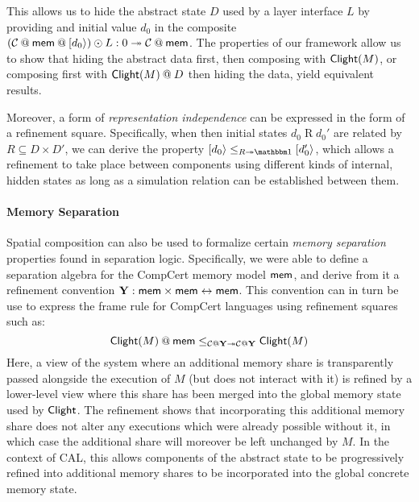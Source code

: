 \begin{example}
This allows us to hide the abstract state $D$
used by a layer interface $L$ by providing and initial value $d_0$
in the composite
$
  (\mathcal{C} \mathbin@ \kw{mem} \mathbin@ [d_0\rangle) \odot L :
  \emptysig \twoheadrightarrow \mathcal{C} \mathbin@ \kw{mem}
$.
The properties of our framework allow us to show that
hiding the abstract data first, then composing with $ \mathsf{Clight} (M)$,
or composing first with $\kw{Clight}(M)\mathbin@ D$ then hiding the data,
yield equivalent results.
\end{example}

Moreover, a form of \emph{representation independence}
can be expressed in the form of a refinement square.
Specifically,
when then initial states $d_0 \mathrel{R} d_0'$
are related by $R \subseteq D \times D'$,
we can derive the property
$
  [d_0 \rangle \le_{R \twoheadrightarrow \mathbbm1} [d_0'\rangle
$,
which allows a refinement to take place between components
using different kinds of internal, hidden states
as long as a simulation relation can be established between them.

\paragraph{Memory Separation}

Spatial composition can also be used to formalize
certain \emph{memory separation} properties found in separation logic.
Specifically,
we were able to define a separation algebra for the CompCert memory model $ \mathsf{mem} $,
and derive from it a refinement convention
$\mathbf{Y} :  \mathsf{mem}  \times  \mathsf{mem}  \leftrightarrow  \mathsf{mem} $.
This convention can in turn be use to express the frame rule
for CompCert languages using refinement squares such as:
\[
  \kw{Clight}(M) \mathbin@ \kw{mem} \le_{\mathcal{C} \mathbin@ \mathbf{Y} \twoheadrightarrow
  \mathcal{C} \mathbin@ \mathbf{Y}} \kw{Clight}(M)
\]
Here, a view of the system where an additional memory share
is transparently passed alongside the execution of $M$ (but does not interact with it)
is refined by a lower-level view where this share
has been merged into the global memory state used by $ \mathsf{Clight} $. 
The refinement shows that incorporating this additional memory share
does not alter any executions which were already possible without it,
in which case the additional share will moreover be left unchanged by $M$.
In the context of CAL,
this allows components of the abstract state
to be progressively refined into additional memory shares
to be incorporated into the global concrete memory state.

